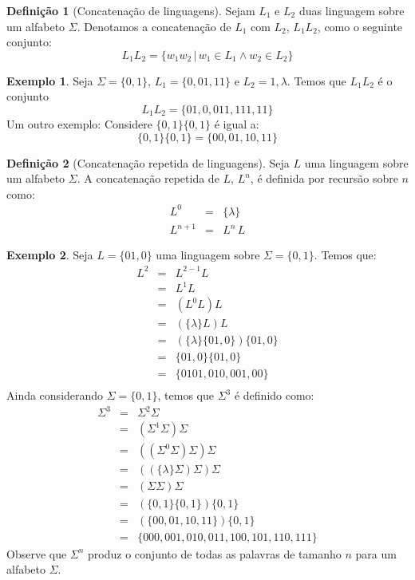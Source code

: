 \documentclass[a4paper]{article}
\theoremstyle{definition}
\newtheorem{Example}{Exemplo}
\newtheorem{Definition}{Definição}
\begin{document}
  \begin{Definition}[Concatenação de linguagens]
    Sejam $L_1$ e $L_2$ duas linguagem sobre um alfabeto $\Sigma$. Denotamos
    a concatenação de $L_1$ com $L_2$, $L_1L_2$, como o seguinte conjunto:
    \[
      L_1L_2 = \{w_1w_2\,|\,w_1 \in L_1 \land w_2 \in L_2\}
    \]
  \end{Definition}
  \begin{Example}
    Seja $\Sigma = \{0,1\}$, $L_1 = \{0,01,11\}$ e $L_2 = {1,\lambda}$. Temos
    que $L_1L_2$ é o conjunto
    \[
      L_1L_2 =\{01, 0, 011, 111, 11\}
    \]
    Um outro exemplo: Considere $\{0,1\}\{0,1\}$ é igual a:
    \[
      \{0,1\}\{0,1\} = \{00,01,10,11\}
    \]
  \end{Example}

  \begin{Definition}[Concatenação repetida de linguagens]
    Seja $L$ uma linguagem sobre um alfabeto $\Sigma$. A concatenação
    repetida de $L$, $L^n$, é definida por recursão sobre $n$ como:
    \[
      \begin{array}{lcl}
        L^0 & = & \{\lambda\}\\
        L ^{n + 1} & = & L^n\,L
      \end{array}
    \]
  \end{Definition}

  \begin{Example}
    Seja $L = \{01,0\}$ uma linguagem sobre $\Sigma = \{0,1\}$. Temos que:
    \[
      \begin{array}{lcl}
        L^2 & = & L^{2 - 1} L \\
            & = & L^1 L \\
            & = & (L^0 L) L \\
            & = & (\{\lambda\} L) L \\
            & = & (\{\lambda\} \{01,0\})\{01,0\} \\
            & = & \{01,0\}\{01,0\} \\
            & = & \{0101, 010, 001, 00\}\\
      \end{array}
    \]
    Ainda considerando $\Sigma = \{0,1\}$, temos que $\Sigma^3$ é definido como:
    \[
      \begin{array}{lcl}
        \Sigma^3 & = & \Sigma^2 \Sigma \\
                 & = & (\Sigma^1 \Sigma) \Sigma \\
                 & = & ((\Sigma^0 \Sigma) \Sigma) \Sigma \\
                 & = & ((\{\lambda\}\Sigma)\Sigma) \Sigma \\
                 & = & (\Sigma \Sigma) \Sigma \\
                 & = & (\{0,1\}\{0,1\})\{0,1\} \\
                 & = & (\{00,01,10,11\})\{0,1\} \\
                 & = & \{000, 001, 010, 011, 100, 101, 110, 111\}
      \end{array}
    \]
    Observe que $\Sigma^n$ produz o conjunto de todas as palavras de tamanho $n$
    para um alfabeto $\Sigma$.
  \end{Example}
\end{document}
